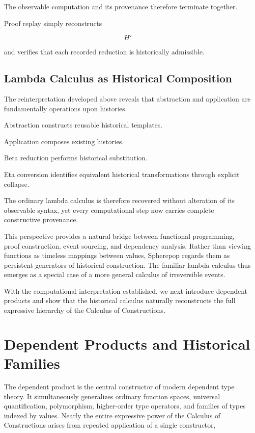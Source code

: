 \documentclass[12pt,oneside]{article}
\theoremstyle{definition}
\theoremstyle{remark}
\begin{document}
The observable computation and its provenance therefore terminate together.

Proof replay simply reconstructs

\[
H'
\]

and verifies that each recorded reduction is historically admissible.

\subsection{Lambda Calculus as Historical Composition}

The reinterpretation developed above reveals that abstraction and application
are fundamentally operations upon histories.

Abstraction constructs reusable historical templates.

Application composes existing histories.

Beta reduction performs historical substitution.

Eta conversion identifies equivalent historical transformations through explicit
collapse.

The ordinary lambda calculus is therefore recovered without alteration of its
observable syntax, yet every computational step now carries complete
constructive provenance.

This perspective provides a natural bridge between functional programming,
proof construction, event sourcing, and dependency analysis. Rather than viewing
functions as timeless mappings between values, Spherepop regards them as
persistent generators of historical construction. The familiar lambda calculus
thus emerges as a special case of a more general calculus of irreversible
events.

With the computational interpretation established, we next introduce dependent
products and show that the historical calculus naturally reconstructs the full
expressive hierarchy of the Calculus of Constructions.

\section{Dependent Products and Historical Families}

The dependent product is the central constructor of modern dependent type
theory. It simultaneously generalizes ordinary function spaces, universal
quantification, polymorphism, higher-order type operators, and families of
types indexed by values. Nearly the entire expressive power of the Calculus of
Constructions arises from repeated application of a single constructor,
\end{document}
